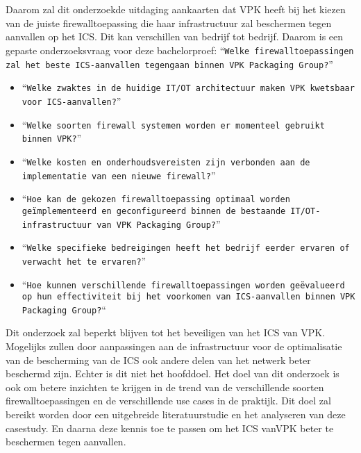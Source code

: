 \section{}%
\label{sec:onderzoeksvraag}

Daarom zal dit onderzoekde uitdaging aankaarten dat VPK heeft bij het kiezen van de juiste firewalltoepassing die haar infrastructuur zal beschermen tegen aanvallen op het ICS. Dit kan verschillen van bedrijf tot bedrijf. Daarom is een gepaste onderzoeksvraag voor deze bachelorproef: ``\texttt{Welke firewalltoepassingen zal het beste ICS-aanvallen tegengaan binnen VPK Packaging Group?}''

\begin{itemize}
    \item ``\texttt{Welke zwaktes in de huidige IT/OT architectuur maken VPK kwetsbaar voor ICS-aanvallen?}''
    \item ``\texttt{Welke soorten firewall systemen worden er momenteel gebruikt binnen VPK?}''
    \item ``\texttt{Welke kosten en onderhoudsvereisten zijn verbonden aan de implementatie van een nieuwe firewall?}''
    \item ``\texttt{Hoe kan de gekozen firewalltoepassing optimaal worden geïmplementeerd en geconfigureerd binnen de bestaande IT/OT-infrastructuur van VPK Packaging Group?}''
    \item ``\texttt{Welke specifieke bedreigingen heeft het bedrijf eerder ervaren of verwacht het te ervaren?}''
    \item ``\texttt{Hoe kunnen verschillende firewalltoepassingen worden geëvalueerd op hun effectiviteit bij het voorkomen van ICS-aanvallen binnen VPK Packaging Group?}``
    \end{itemize}
    


Dit onderzoek zal beperkt blijven tot het beveiligen van het ICS van VPK. Mogelijks zullen door aanpassingen aan de infrastructuur voor de optimalisatie van de bescherming van de ICS ook andere delen van het netwerk beter beschermd zijn. Echter is dit niet het hoofddoel. Het doel van dit onderzoek is ook om betere inzichten te krijgen in de trend van de verschillende soorten firewalltoepassingen en de verschillende use cases in de praktijk. Dit doel zal bereikt worden door een uitgebreide literatuurstudie en het analyseren van deze casestudy. En daarna deze kennis toe te passen om het ICS vanVPK beter te beschermen tegen aanvallen.

